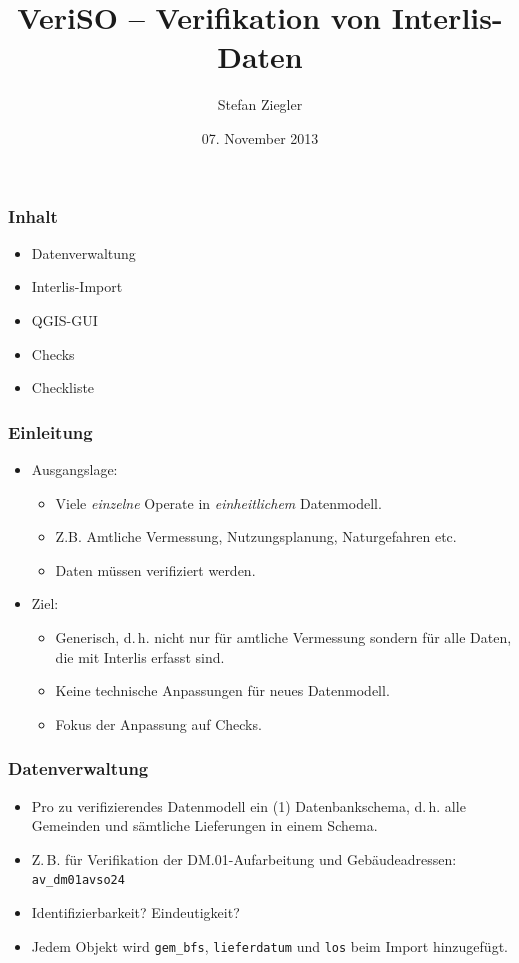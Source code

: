 \documentclass{beamer}
\title{VeriSO -- Verifikation von Interlis-Daten}
\author[Stefan Ziegler]%
{Stefan Ziegler}%
\institute[Amt für Geoinformation]{%
Amt für Geoinformation \\
Rötistrasse 4\\
4500 Solothurn}
\date[07.11.13]{07. November 2013}
\begin{document}
\begin{frame}
  \titlepage
\end{frame}

\begin{frame}
  \frametitle{Inhalt}
  \begin{itemize}
  \item Datenverwaltung
  \item Interlis-Import
  \item QGIS-GUI
  \item Checks
  \item Checkliste
  \end{itemize}
\end{frame}

\begin{frame}
  \frametitle{Einleitung}
  \begin{itemize}
  \item Ausgangslage: 
  \begin{itemize}
   \item Viele \textit{einzelne} Operate in \textit{einheitlichem} Datenmodell.
   \item Z.B. Amtliche Vermessung, Nutzungsplanung, Naturgefahren etc. 
   \item Daten müssen verifiziert werden.
  \end{itemize}

  \item Ziel: 
  \begin{itemize}
   \item Generisch, d.\,h. nicht nur für amtliche Vermessung sondern für alle Daten, die mit Interlis erfasst sind.
   \item Keine technische Anpassungen für neues Datenmodell.
   \item Fokus der Anpassung auf Checks.
  \end{itemize}  
    \end{itemize}
\end{frame}

\begin{frame}
  \frametitle{Datenverwaltung}
  \begin{itemize}
  \item Pro zu verifizierendes Datenmodell ein (1) Datenbankschema, d.\,h. alle Gemeinden und sämtliche Lieferungen in einem Schema.
  \item Z.\,B. für Verifikation der DM.01-Aufarbeitung und Gebäudeadressen: \texttt{av\_dm01avso24}
  \item Identifizierbarkeit? Eindeutigkeit?
  \item Jedem Objekt wird \texttt{gem\_bfs}, \texttt{lieferdatum} und \texttt{los} beim Import hinzugefügt.
  \end{itemize}
\end{frame}
\end{document}
